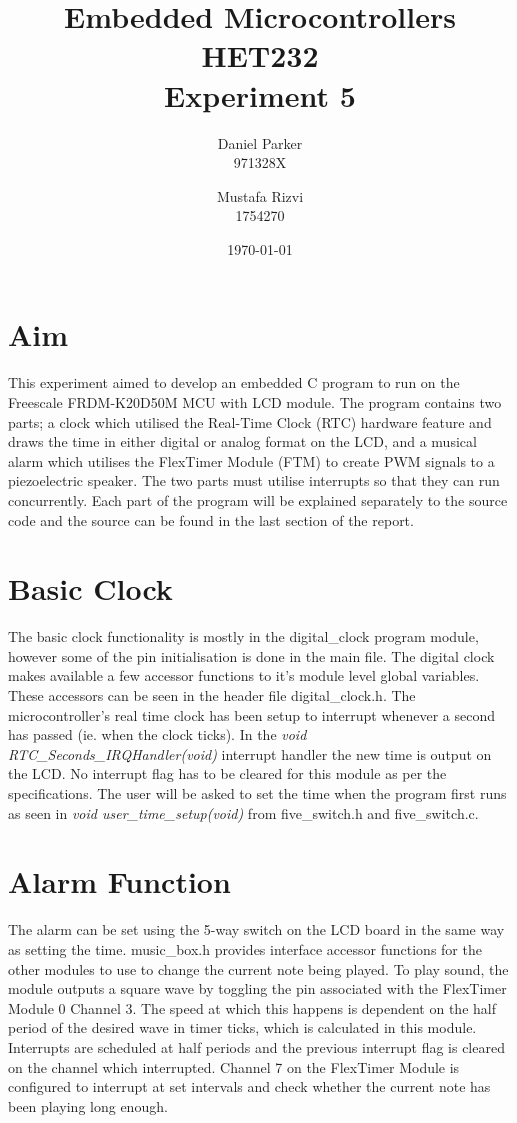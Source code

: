 \documentclass[a4paper]{article}
\title{Embedded Microcontrollers HET232 \\ Experiment 5}
\author{Daniel Parker \\ 971328X \and Mustafa Rizvi \\ 1754270}
\date{\today}
\begin{document}
\maketitle
\section{Aim}
This experiment aimed to develop an embedded C program to run on the Freescale FRDM-K20D50M MCU with LCD module. The program contains two parts; a clock which utilised the Real-Time Clock (RTC) hardware feature and draws the time in either digital or analog format on the LCD, and a musical alarm which utilises the FlexTimer Module (FTM) to create PWM signals to a piezoelectric speaker. The two parts must utilise interrupts so that they can run concurrently. Each part of the program will be explained separately to the source code and the source can be found in the last section of the report.

\maketitle
\section{Basic Clock}
The basic clock functionality is mostly in the digital\_clock program module, however some of the pin initialisation is done in the main file. The digital clock makes available a few accessor functions to it's module level global variables. These accessors can be seen in the header file digital\_clock.h. The microcontroller's real time clock has been setup to interrupt whenever a second has passed (ie. when the clock ticks). In the \emph{void RTC\_Seconds\_IRQHandler(void)} interrupt handler the new time is output on the LCD. No interrupt flag has to be cleared for this module as per the specifications. The user will be asked to set the time when the program first runs as seen in \emph{void user\_time\_setup(void)} from five\_switch.h and five\_switch.c.

\maketitle
\section{Alarm Function}
The alarm can be set using the 5-way switch on the LCD board in the same way as setting the time. music\_box.h provides interface accessor functions for the other modules to use to change the current note being played. To play sound, the module outputs a square wave by toggling the pin associated with the FlexTimer Module 0 Channel 3. The speed at which this happens is dependent on the half period of the desired wave in timer ticks, which is calculated in this module. Interrupts are scheduled at half periods and the previous interrupt flag is cleared on the channel which interrupted. Channel 7 on the FlexTimer Module is configured to interrupt at set intervals and check whether the current note has been playing long enough. 
\end{document}
